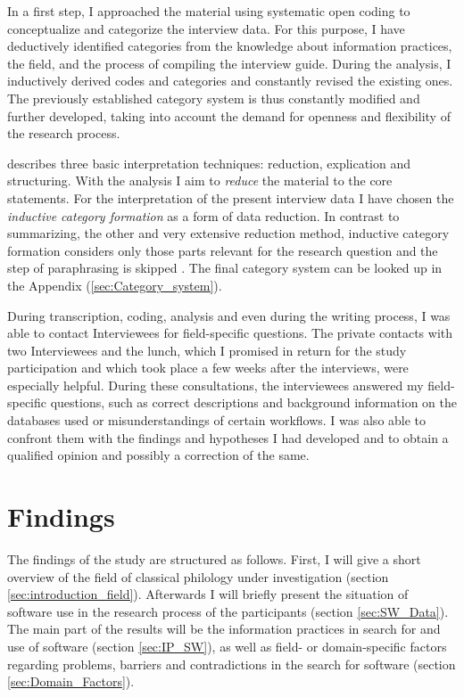 \documentclass[12pt, a4paper, titlepage, oneside, abstract=true, toc=listof, toc=bibliography]{scrreprt}
\begin{document}
In a first step, I approached the material using systematic open coding \citep{Corbin1990} to conceptualize and categorize the interview data. For this purpose, I have deductively identified categories from the knowledge about information practices, the field, and the process of compiling the interview guide. During the analysis, I inductively derived codes and categories and constantly revised the existing ones. The previously established category system is thus constantly modified and further developed, taking into account the demand for openness and flexibility of the research process. 

\citet[p. 65]{Mayring2014} describes three basic interpretation techniques: reduction, explication and structuring. With the analysis I aim to \textit{reduce} the material to the core statements. For the interpretation of the present interview data I have chosen the \textit{inductive category formation} as a form of data reduction. In contrast to summarizing, the other and very extensive reduction method, inductive category formation considers only those parts relevant for the research question and the step of paraphrasing is skipped \cite[p. 79]{Mayring2014}. The final category system can be looked up in the Appendix (\ref{sec:Category_system}).

During transcription, coding, analysis and even during the writing process, I was able to contact Interviewees for field-specific questions. The private contacts with two Interviewees and the lunch, which I promised in return for the study participation and which  took place a few weeks after the interviews, were especially helpful. During these consultations, the interviewees answered my field-specific questions, such as correct descriptions and background information on the databases used or misunderstandings of certain workflows. I was also able to confront them with the findings and hypotheses I had developed and to obtain a qualified opinion and possibly a correction of the same.
	
	
\chapter{Findings}
\label{sec:findings}
The findings of the study are structured as follows. First, I will give a short overview of the field of classical philology under investigation (section \ref{sec:introduction_field}). Afterwards I will briefly present the situation of software use in the research process of the participants (section \ref{sec:SW_Data}). The main part of the results will be the information practices in search for and use of software (section \ref{sec:IP_SW}), as well as field- or domain-specific factors regarding problems, barriers and contradictions in the search for software (section \ref{sec:Domain_Factors}).
\end{document}
